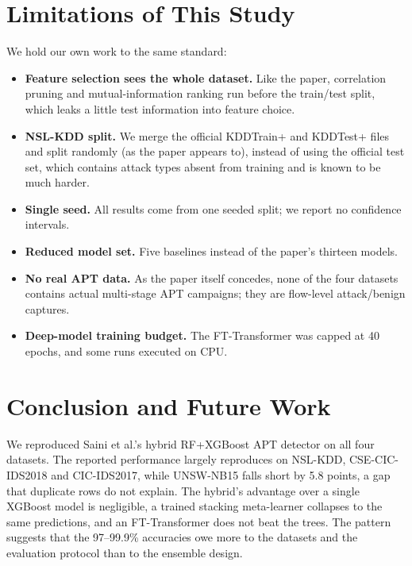 \documentclass[11pt,a4paper]{article}
\begin{document}
\section{Limitations of This Study}
We hold our own work to the same standard:
\begin{itemize}
  \item \textbf{Feature selection sees the whole dataset.} Like the paper, correlation pruning and mutual-information
        ranking run before the train/test split, which leaks a little test information into feature choice.
  \item \textbf{NSL-KDD split.} We merge the official KDDTrain+ and KDDTest+ files and split randomly (as the paper
        appears to), instead of using the official test set, which contains attack types absent from training and
        is known to be much harder.
  \item \textbf{Single seed.} All results come from one seeded split; we report no confidence intervals.
  \item \textbf{Reduced model set.} Five baselines instead of the paper's thirteen models.
  \item \textbf{No real APT data.} As the paper itself concedes, none of the four datasets contains actual
        multi-stage APT campaigns; they are flow-level attack/benign captures.
  \item \textbf{Deep-model training budget.} The FT-Transformer was capped at 40 epochs, and some runs executed on CPU.
\end{itemize}

\section{Conclusion and Future Work}
\label{sec:future}
We reproduced Saini et al.'s hybrid RF+XGBoost APT detector on all four datasets. The reported performance largely
reproduces on NSL-KDD, CSE-CIC-IDS2018 and CIC-IDS2017, while UNSW-NB15 falls short by 5.8 points, a gap that duplicate
rows do not explain. The hybrid's advantage over a single XGBoost model is negligible, a trained stacking
meta-learner collapses to the same predictions, and an FT-Transformer does not beat the trees. The pattern suggests
that the 97--99.9\% accuracies owe more to the datasets and the evaluation protocol than to the ensemble design.
\end{document}

